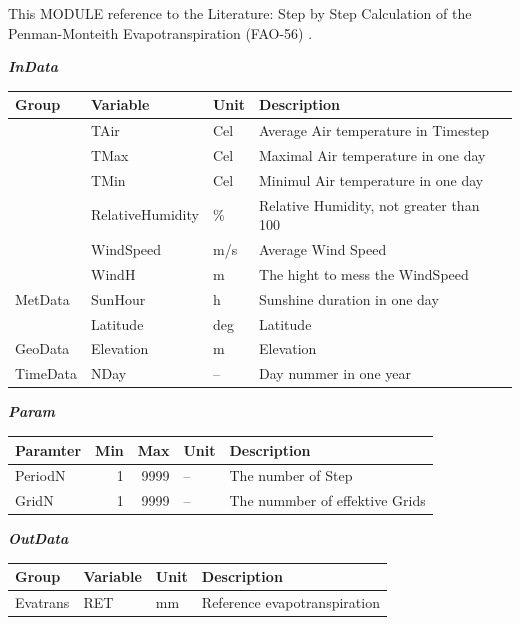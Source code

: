 \documentclass[
]{book}
\begin{document}
This MODULE reference to the Literature: Step by Step Calculation of the Penman-Monteith Evapotranspiration (FAO-56) \citep{LincolnZotarelli.2014}.

\textbf{\emph{InData}}

\begin{table}[!h]
\centering
\begin{tabular}{l|l|l|l}
\hline
Group & Variable & Unit & Description\\
\hline
 & TAir & Cel & Average Air temperature in Timestep\\
\cline{2-4}
 & TMax & Cel & Maximal Air temperature in one day\\
\cline{2-4}
 & TMin & Cel & Minimul Air temperature in one day\\
\cline{2-4}
 & RelativeHumidity & \% & Relative Humidity, not greater than 100\\
\cline{2-4}
 & WindSpeed & m/s & Average Wind Speed\\
\cline{2-4}
 & WindH & m & The hight to mess the WindSpeed\\
\cline{2-4}
\multirow{-7}{*}{\raggedright\arraybackslash MetData} & SunHour & h & Sunshine duration in one day\\
\cline{1-4}
 & Latitude & deg & Latitude\\
\cline{2-4}
\multirow{-2}{*}{\raggedright\arraybackslash GeoData} & Elevation & m & Elevation\\
\cline{1-4}
TimeData & NDay & -- & Day nummer in one year\\
\hline
\end{tabular}
\end{table}

\textbf{\emph{Param}}

\begin{table}[!h]
\centering
\begin{tabular}{l|r|r|l|l}
\hline
Paramter & Min & Max & Unit & Description\\
\hline
PeriodN & 1 & 9999 & -- & The number of Step\\
\cline{1-5}
GridN & 1 & 9999 & -- & The nummber of effektive Grids\\
\hline
\end{tabular}
\end{table}

\textbf{\emph{OutData}}

\begin{table}[!h]
\centering
\begin{tabular}{l|l|l|l}
\hline
Group & Variable & Unit & Description\\
\hline
Evatrans & RET & mm & Reference evapotranspiration\\
\hline
\end{tabular}
\end{table}
\end{document}
